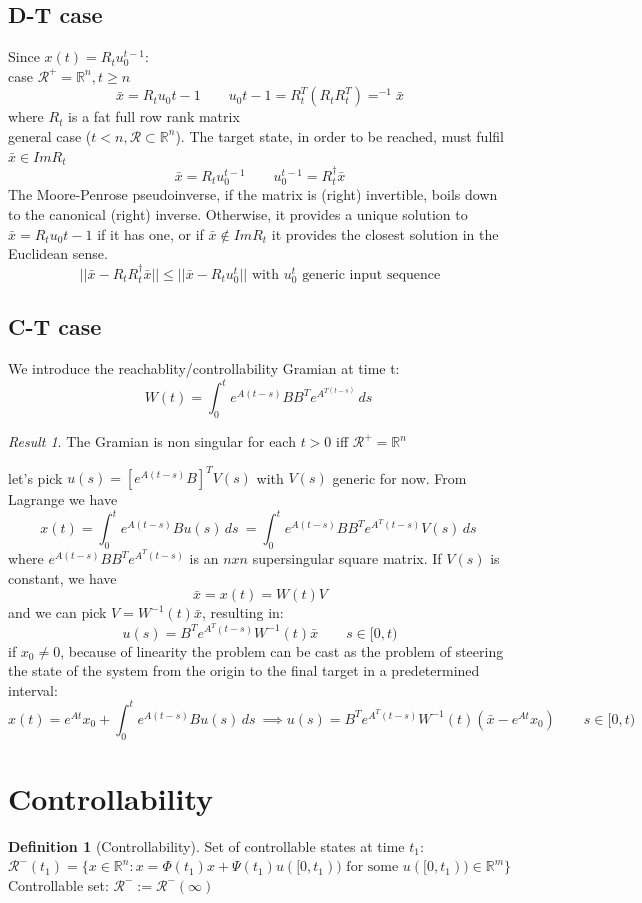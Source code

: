 \documentclass{book}
\newcommand{\R}{\mathbb{R}}
\theoremstyle{definition}
\newtheorem{definition}{Definition}[section]
\theoremstyle{remark}
\theoremstyle{remark}
\newtheorem*{result}{Result}
\begin{document}
\subsection{D-T case}
Since \(x(t)=R_tu_0^{t-1}\):\\
case \(\mathcal{R}^+=\R^n, t\geq n\)
\[
\bar{x}=R_tu_0{t-1} \qquad u_0{t-1}=R^T_t(R_tR^T_t)=^{-1}\bar{x}
\]
where $R_t$ is a fat full row rank matrix\\
general case (\(t<n, \mathcal{R}\subset \R^n\)). The target state, in order to be reached, must fulfil \(\bar{x} \in ImR_t\)
\[
\bar{x}=R_tu_0^{t-1} \qquad u_0^{t-1}={R}_t^{\dagger} \bar{x}
\]
The Moore-Penrose pseudoinverse, if the matrix is (right) invertible, boils down to the canonical (right) inverse. Otherwise, it provides a unique solution to \(\bar{x}=R_tu_0{t-1}\) if it has one, or if \(\bar{x}\notin ImR_t\) it provides the closest solution in the Euclidean sense.
\[
||\bar{x}-R_tR_t^{\dagger}\bar{x}||\leq ||\bar{x}-R_tu_0^t|| \text{ with } u_0^t \text{ generic input sequence}
\]

\subsection{C-T case}
We introduce the reachablity/controllability Gramian at time t:
\[
W(t)=\int_0^te^{A(t-s)}BB^Te^{A^{T(t-s)}}\,ds\
\]
\begin{result}
    The Gramian is non singular for each $t>0$ iff $\mathcal{R}^+=\R^n$
\end{result}
let's pick \(u(s)=\left[e^{A(t-s)}B\right]^TV(s)\) with $V(s)$ generic for now. From Lagrange we have
\[
x(t)=\int_0^t e^{A(t-s)}Bu(s)\,ds\ =\int_0^t e^{A(t-s)}B B^Te^{A^T(t-s)}V(s)\,ds\
\]
where \(e^{A(t-s)}B B^Te^{A^T(t-s)}\) is an $nxn$ supersingular square matrix. If $V(s)$ is constant, we have
\[
\bar{x}=x(t)=W(t)V
\]
and we can pick \(V=W^{-1}(t)\bar{x}\), resulting in:
\[
u(s)=B^Te^{A^T(t-s)}W^{-1}(t)\bar{x} \qquad s\in [0,t)
\]
if $x_0\neq 0$, because of linearity the problem can be cast as the problem of steering the state of the system from the origin to the final target in a  predetermined interval:
\[
    x(t)=e^{At}x_0+\int_0^t e^{A(t-s)}Bu(s)\,ds\ \implies u(s)=B^Te^{A^T(t-s)}W^{-1}(t)(\bar{x}-e^{At}x_0) \qquad  s\in [0,t)
\]
\section{Controllability}

\begin{definition}[Controllability]
    Set of controllable states  at time $t_1$: \(\mathcal{R}^-(t_1)=\{x\in \R^n : x = \Phi(t_1)x+\Psi(t_1)u([0,t_1)) \text{ for some }u([0,t_1)) \in \R^m\}\)\\
    Controllable set: \(\mathcal{R}^-:=\mathcal{R}^-(\infty)\)
\end{definition}
\end{document}
